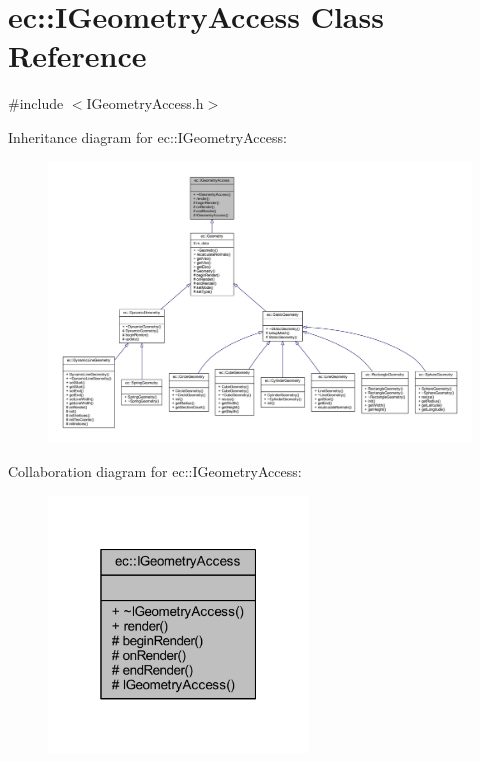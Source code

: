 \hypertarget{classec_1_1_i_geometry_access}{}\section{ec\+:\+:I\+Geometry\+Access Class Reference}
\label{classec_1_1_i_geometry_access}


{\ttfamily \#include $<$I\+Geometry\+Access.\+h$>$}



Inheritance diagram for ec\+:\+:I\+Geometry\+Access\+:\nopagebreak
\begin{figure}[H]
\begin{center}
\leavevmode
\includegraphics[width=350pt]{classec_1_1_i_geometry_access__inherit__graph}
\end{center}
\end{figure}


Collaboration diagram for ec\+:\+:I\+Geometry\+Access\+:\nopagebreak
\begin{figure}[H]
\begin{center}
\leavevmode
\includegraphics[width=196pt]{classec_1_1_i_geometry_access__coll__graph}
\end{center}
\end{figure}
